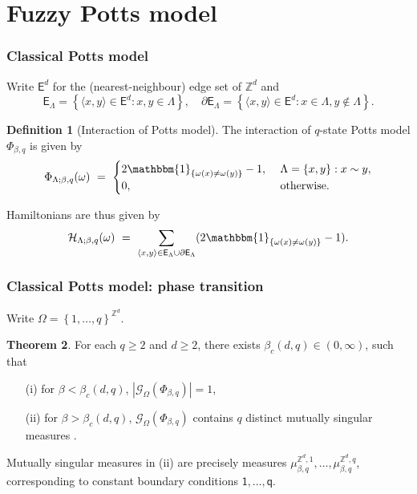 \documentclass{beamer}
\newcommand{\E}{\mathsf{E}}
\newcommand{\G}{\mathcal{G}}
\renewcommand{\H}{\mathcal{H}}
\newcommand{\Z}{\mathbb{Z}}
\newcommand{\set}[1]{\left\{#1\right\}}
\newcommand{\1}{\mathbbm{1}}
\renewcommand{\sp}[1]{\langle #1\rangle}
\newcommand{\5}{\vspace{0.5cm}}
\newcommand{\3}{\vspace{0.3cm}}
\theoremstyle{definition}
\newtheorem{thm}{Theorem}[section]
\newtheorem{df}[thm]{Definition}
\begin{document}

\section{Fuzzy Potts model}


\begin{frame}
\frametitle{Classical Potts model}
Write $\E^d$ for the (nearest-neighbour) edge set of $\Z^d$ and
$$\E_\Lambda=\set{\sp{x,y}\in\E^d:x,y\in\Lambda}, \quad \partial\E_\Lambda=\set{\sp{x,y}\in\E^d:x\in\Lambda,y\notin\Lambda}.$$
\begin{df}[Interaction of Potts model]
The interaction of $q$-state Potts model $\Phi_{\beta,q}$ is given by
$$\Phi_{\Lambda;\beta,q}(\omega) ~=~ \begin{cases}
2\1_{\set{\omega(x)\neq\omega(y)}}-1, ~& \Lambda=\set{x,y}:x\sim y, \\
0, ~&\text{otherwise}.
\end{cases}$$
\end{df}
Hamiltonians are thus given by
$$\H_{\Lambda;\beta,q}(\omega) ~=~ \sum_{\sp{x,y}\in\E_\Lambda\cup\partial\E_\Lambda}(2\1_{\set{\omega(x)\neq\omega(y)}}-1).$$
\end{frame}

\begin{frame}
\frametitle{Classical Potts model: phase transition}
Write $\Omega=\set{1,\ldots,q}^{\Z^d}$.\vspace{0.3cm}
\begin{thm}
For each $q\geq 2$ and $d\geq 2$, there exists $\beta_c(d,q)\in(0,\infty)$, such that 
\begin{itemize}
	\item[(i)] for $\beta<\beta_c(d,q)$, $|\G_{\Omega}(\Phi_{\beta,q})|=1$,
	\item[(ii)] for $\beta>\beta_c(d,q)$, $\G_{\Omega}(\Phi_{\beta,q})$ contains $q$ distinct mutually singular measures .
\end{itemize}
\end{thm}\vspace{0.3cm}
Mutually singular measures in (ii) are precisely measures $\mu_{\beta,q}^{\Z^d,1},\ldots,\mu_{\beta,q}^{\Z^d,q}$, corresponding to constant boundary conditions $\mathsf{1},\ldots,\mathsf{q}$.
\end{frame}
\end{document}

